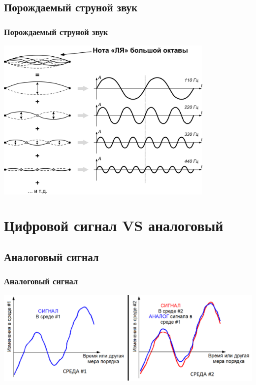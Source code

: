 \subsection{Порождаемый струной звук}

\begin{frame}
    \frametitle{Порождаемый струной звук}

    \begin{center}
        \includegraphics[width=0.8\textwidth]{figs/string-frequences}
    \end{center}
\end{frame}


\section{Цифровой сигнал VS аналоговый}


\subsection{Аналоговый сигнал}

\begin{frame}
    \frametitle{Аналоговый сигнал}

    \begin{center}
        \includegraphics[width=\textwidth]{figs/analog}
    \end{center}
\end{frame}


